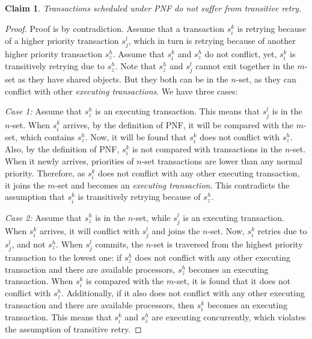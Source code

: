 \documentclass[12pt,english]{report}
\newtheorem{clm}{Claim}
\newtheorem{proof}{Proof}
\begin{document}
\begin{clm}\label{PNF-transitive-retry}
Transactions scheduled under PNF do not suffer from transitive
retry.
\end{clm}
\begin{proof}\normalfont
Proof is by contradiction. Assume that a transaction $s_{i}^{k}$
is retrying because of a higher priority transaction $s_{j}^{l}$, which
in turn is retrying because of another higher priority transaction
$s_{z}^{h}$. Assume that $s_{i}^{k}$ and $s_{z}^{h}$ do not conflict, yet,
$s_{i}^{k}$ is transitively retrying due to $s_{z}^{h}$. 
Note that $s_{z}^{h}$ and $s_{j}^{l}$ cannot exit together in
the $m$-set as they have shared objects. But they both can
be in the $n$-set, as they can conflict with other \emph{executing
transactions}. We have three cases:

\textit{Case 1:} Assume that $s_{z}^{h}$ is an executing transaction. This means that $s_{j}^{l}$ is in the $n$-set. When $s_{i}^{k}$ arrives, by the definition of PNF, it will be compared with the $m$-set, which contains $s_{z}^{h}$. Now, it will be found that $s_{i}^{k}$ does not conflict with $s_{z}^{h}$. Also, by the definition of PNF, $s_{i}^{k}$ is not compared with transactions in the $n$-set. When it newly arrives, priorities of $n$-set transactions are lower than any normal priority. Therefore, as $s_{i}^{k}$ does not conflict with any other executing
transaction, it joins the $m$-set and becomes an \emph{executing
transaction}. This contradicts the assumption that $s_{i}^{k}$
is transitively retrying because of $s_{z}^{h}$.



\textit{Case 2:} Assume that $s_{z}^{h}$ is in the $n$-set, while $s_{j}^{l}$
is an executing transaction. When $s_{i}^{k}$ arrives, it will conflict
with $s_{j}^{l}$ and joins the $n$-set. Now, $s_{i}^{k}$
retries due to $s_{j}^{l}$, and not $s_{z}^{h}$. When $s_{j}^{l}$ commits,
the $n$-set is traversed from the highest priority transaction
to the lowest one: if $s_{z}^{h}$ does not conflict with any other
executing transaction and there are available processors, $s_{z}^{h}$
becomes an executing transaction. When $s_{i}^{k}$ is compared with 
the $m$-set, it is found that it does not conflict with $s_{z}^{h}$. Additionally, if it also does not conflict with any other executing transaction and there are available processors, then $s_{i}^{k}$ becomes an executing
transaction. This means that $s_{i}^{k}$ and $s_{z}^{h}$ are executing
concurrently, which violates the assumption of transitive retry.


\end{proof}
\end{document}
